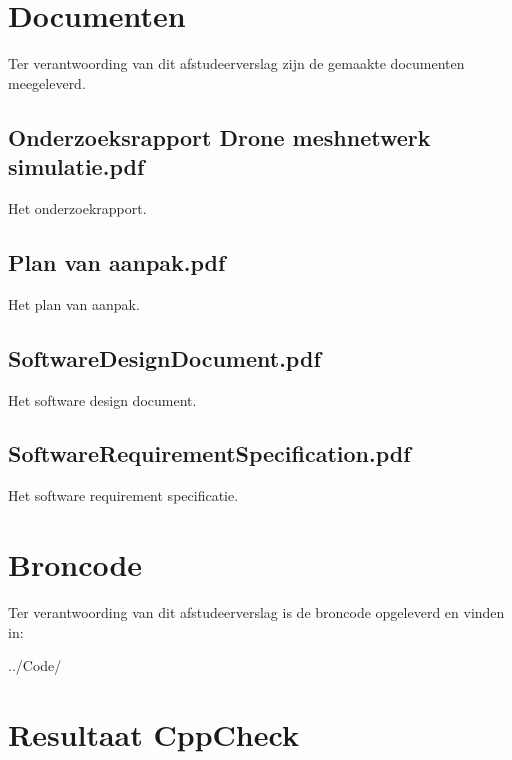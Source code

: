 \documentclass[a4paper, 11pt, oneside]{report}
\begin{document}



\clearpage
\appendix
\chapter{Documenten}
Ter verantwoording van dit afstudeerverslag zijn de gemaakte documenten meegeleverd.
\section[Onderzoeksrapport Drone meshnetwerk simulatie]{Onderzoeksrapport Drone meshnetwerk simulatie.pdf}\label{sec:onderzoeksrapport-drone-meshnetwerk-simulatie}
Het onderzoekrapport.
\section[Plan van aanpak]{Plan van aanpak.pdf}\label{app:bijlage:plan-van-aanpak}
Het plan van aanpak.
\section[SoftwareDesignDocument]{SoftwareDesignDocument.pdf}\label{app:SoftwareDesignDocument}
Het software design document.
\section[SoftwareRequirementSpecification]{SoftwareRequirementSpecification.pdf}\label{app:softwarerequirementspecification}
Het software requirement specificatie.
\chapter{Broncode}\label{app:broncode}
Ter verantwoording van dit afstudeerverslag is de broncode opgeleverd en vinden in:

../Code/

\chapter{Resultaat CppCheck}\label{sec:resultaat-cppcheck}
\end{document}
